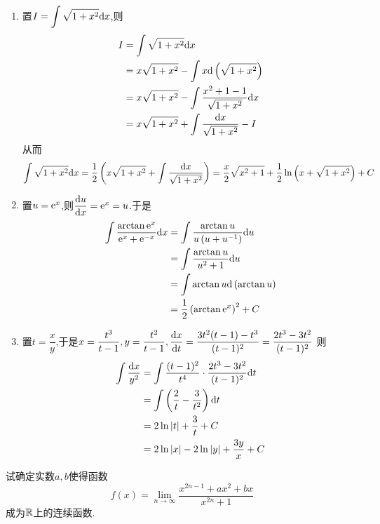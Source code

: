 \documentclass{ctexart}
\begin{document}
\begin{solution}
    \begin{enumerate}[leftmargin=*,label=\textbf{(\arabic*)}]
        \item 置$\displaystyle I=\int\sqrt{1+x^2}\mathrm{d} x$,则
            $$\begin{aligned}
                I
                &= \int\sqrt{1+x^2}\mathrm{d} x \\
                &= x\sqrt{1+x^2}-\int x\mathrm{d}\left(\sqrt{1+x^2}\right) \\
                &= x\sqrt{1+x^2}-\int\dfrac{x^2+1-1}{\sqrt{1+x^2}}\mathrm{d} x \\
                &= x\sqrt{1+x^2}+\int\dfrac{\mathrm{d} x}{\sqrt{1+x^2}}-I
            \end{aligned}$$
            从而
            $$\int\sqrt{1+x^2}\mathrm{d} x=\dfrac{1}{2}\left(x\sqrt{1+x^2}+\int\dfrac{\mathrm{d} x}{\sqrt{1+x^2}}\right)=\dfrac{x}{2}\sqrt{x^2+1}+\dfrac{1}{2}\ln\left(x+\sqrt{1+x^2}\right)+C$$
        \item 置$u=\mathrm{e}^x$,则$\dfrac{\mathrm{d} u}{\mathrm{d} x}=\mathrm{e}^x=u$.于是
            $$\begin{aligned}
                \int\dfrac{\arctan \mathrm{e}^x}{\mathrm{e}^x+\mathrm{e}^{-x}}\mathrm{d} x
                &= \int\dfrac{\arctan u}{u\left(u+u^{-1}\right)}\mathrm{d} u \\
                &= \int\dfrac{\arctan u}{u^2+1}\mathrm{d} u \\
                &= \int{\arctan u\mathrm{d}\left(\arctan u\right)} \\
                &= \dfrac{1}{2}\left(\arctan\mathrm{e}^x\right)^2+C
            \end{aligned}$$
        \item 置$t=\dfrac{x}{y}$,于是$x=\dfrac{t^3}{t-1},y=\dfrac{t^2}{t-1},\dfrac{\mathrm{d} x}{\mathrm{d} t}=\dfrac{3t^2(t-1)-t^3}{(t-1)^2}=\dfrac{2t^3-3t^2}{(t-1)^2}$
            则$$\begin{aligned}
                \int\dfrac{\mathrm{d} x}{y^2}
                &= \int{\dfrac{(t-1)^2}{t^4}\cdot\dfrac{2t^3-3t^2}{(t-1)^2}\mathrm{d}t} \\
                &= \int{\left(\dfrac{2}{t}-\dfrac{3}{t^2}\right)\mathrm{d}t} \\
                &= 2\ln\left|t\right|+\dfrac{3}{t}+C \\
                &= 2\ln\left|x\right|-2\ln\left|y\right|+\dfrac{3y}{x}+C
            \end{aligned}$$
    \end{enumerate}
\end{solution}
\begin{problem}[4.(10\songti{分})]
    试确定实数$a,b$使得函数$$f(x)=\lim_{n\to\infty}{\dfrac{x^{2n-1}+ax^2+bx}{x^{2n}+1}}$$成为$\mathbb{R}$上的连续函数.
\end{problem}
\end{document}
